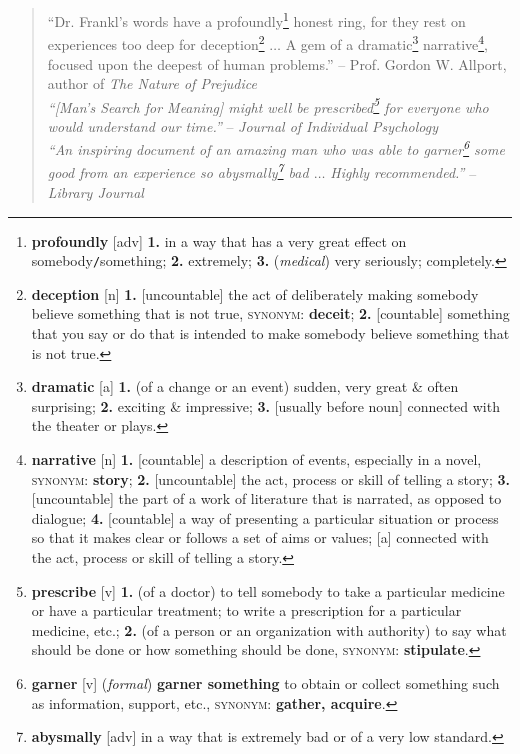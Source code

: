 \documentclass[oneside]{book}
\numberwithin{equation}{section}
\begin{document}
\begin{quotation}
	``Dr. Frankl's words have a profoundly\footnote{\textbf{profoundly} [adv] \textbf{1.} in a way that has a very great effect on somebody\texttt{/}something; \textbf{2.} extremely; \textbf{3.} (\textit{medical}) very seriously; completely.} honest ring, for they rest on experiences too deep for deception\footnote{\textbf{deception} [n] \textbf{1.} [uncountable] the act of deliberately making somebody believe something that is not true, \textsc{synonym}: \textbf{deceit}; \textbf{2.} [countable] something that you say or do that is intended to make somebody believe something that is not true.} $\ldots$ A gem of a dramatic\footnote{\textbf{dramatic} [a] \textbf{1.} (of a change or an event) sudden, very great \& often surprising; \textbf{2.} exciting \& impressive; \textbf{3.} [usually before noun] connected with the theater or plays.} narrative\footnote{\textbf{narrative} [n] \textbf{1.} [countable] a description of events, especially in a novel, \textsc{synonym}: \textbf{story}; \textbf{2.} [uncountable] the act, process or skill of telling a story; \textbf{3.} [uncountable] the part of a work of literature that is narrated, as opposed to dialogue; \textbf{4.} [countable] a way of presenting a particular situation or process so that it makes clear or follows a set of aims or values; [a] connected with the act, process or skill of telling a story.}, focused upon the deepest of human problems.'' -- Prof. Gordon W. Allport, author of \textit{The Nature of Prejudice}\\
	
	\textit{``\emph{[Man's Search for Meaning]} might well be prescribed\footnote{\textbf{prescribe} [v] \textbf{1.} (of a doctor) to tell somebody to take a particular medicine or have a particular treatment; to write a prescription for a particular medicine, etc.; \textbf{2.} (of a person or an organization with authority) to say what should be done or how something should be done, \textsc{synonym}: \textbf{stipulate}.} for everyone who would understand our time.''} -- \textit{Journal of Individual Psychology}\\
	
	\textit{``An inspiring document of an amazing man who was able to garner\footnote{\textbf{garner} [v] (\textit{formal}) \textbf{garner something} to obtain or collect something such as information, support, etc., \textsc{synonym}: \textbf{gather, acquire}.} some good from an experience so abysmally\footnote{\textbf{abysmally} [adv] in a way that is extremely bad or of a very low standard.} bad $\ldots$ Highly recommended.''} -- \textit{Library Journal}
\end{quotation}
\end{document}
